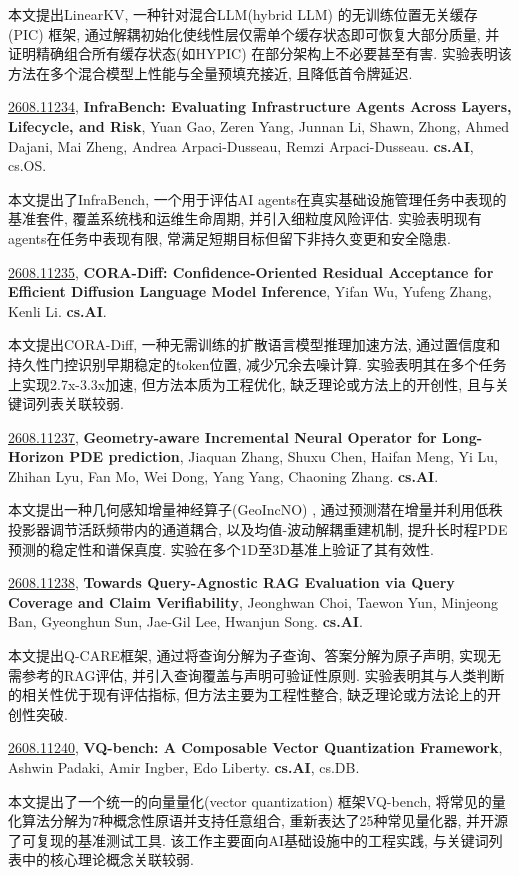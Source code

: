 \documentclass[9pt, a4paper]{article}
\theoremstyle{plain}
\theoremstyle{definition}
\theoremstyle{remark}
\newcommand{\arxivwithtarget}[3]{\hypertarget{#1}{}\href{https://arxiv.org/abs/#1}{#1}, \textbf{\textcolor{arxivblue}{#2}}, #3. }
\begin{document}
本文提出LinearKV, 一种针对混合LLM(hybrid LLM) 的无训练位置无关缓存(PIC) 框架, 通过解耦初始化使线性层仅需单个缓存状态即可恢复大部分质量, 并证明精确组合所有缓存状态(如HYPIC) 在部分架构上不必要甚至有害. 实验表明该方法在多个混合模型上性能与全量预填充接近, 且降低首令牌延迟.


\arxivwithtarget{2608.11234}{InfraBench: Evaluating Infrastructure Agents Across Layers, Lifecycle, and Risk}{Yuan Gao, Zeren Yang, Junnan Li, Shawn, Zhong, Ahmed Dajani, Mai Zheng, Andrea Arpaci-Dusseau, Remzi Arpaci-Dusseau}\textbf{cs.AI}, cs.OS.

本文提出了InfraBench, 一个用于评估AI agents在真实基础设施管理任务中表现的基准套件, 覆盖系统栈和运维生命周期, 并引入细粒度风险评估. 实验表明现有agents在任务中表现有限, 常满足短期目标但留下非持久变更和安全隐患.


\arxivwithtarget{2608.11235}{CORA-Diff: Confidence-Oriented Residual Acceptance for Efficient Diffusion Language Model Inference}{Yifan Wu, Yufeng Zhang, Kenli Li}\textbf{cs.AI}.

本文提出CORA-Diff, 一种无需训练的扩散语言模型推理加速方法, 通过置信度和持久性门控识别早期稳定的token位置, 减少冗余去噪计算. 实验表明其在多个任务上实现2.7x-3.3x加速, 但方法本质为工程优化, 缺乏理论或方法上的开创性, 且与关键词列表关联较弱.


\arxivwithtarget{2608.11237}{Geometry-aware Incremental Neural Operator for Long-Horizon PDE prediction}{Jiaquan Zhang, Shuxu Chen, Haifan Meng, Yi Lu, Zhihan Lyu, Fan Mo, Wei Dong, Yang Yang, Chaoning Zhang}\textbf{cs.AI}.

本文提出一种几何感知增量神经算子(GeoIncNO) , 通过预测潜在增量并利用低秩投影器调节活跃频带内的通道耦合, 以及均值-波动解耦重建机制, 提升长时程PDE预测的稳定性和谱保真度. 实验在多个1D至3D基准上验证了其有效性.


\arxivwithtarget{2608.11238}{Towards Query-Agnostic RAG Evaluation via Query Coverage and Claim Verifiability}{Jeonghwan Choi, Taewon Yun, Minjeong Ban, Gyeonghun Sun, Jae-Gil Lee, Hwanjun Song}\textbf{cs.AI}.

本文提出Q-CARE框架, 通过将查询分解为子查询、答案分解为原子声明, 实现无需参考的RAG评估, 并引入查询覆盖与声明可验证性原则. 实验表明其与人类判断的相关性优于现有评估指标, 但方法主要为工程性整合, 缺乏理论或方法论上的开创性突破.


\arxivwithtarget{2608.11240}{VQ-bench: A Composable Vector Quantization Framework}{Ashwin Padaki, Amir Ingber, Edo Liberty}\textbf{cs.AI}, cs.DB.

本文提出了一个统一的向量量化(vector quantization) 框架VQ-bench, 将常见的量化算法分解为7种概念性原语并支持任意组合, 重新表达了25种常见量化器, 并开源了可复现的基准测试工具. 该工作主要面向AI基础设施中的工程实践, 与关键词列表中的核心理论概念关联较弱.
\end{document}
